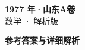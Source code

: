 \documentclass[zihao=-4, a4paper]{ctexart}
\begin{document}
\begin{center}
  {\Large\bfseries 1977 年·山东A卷}\\[4pt]
  {\large 数学 · 解析版}
\end{center}
\medskip
{}

\clearpage
{}
\begin{center}{\Large\bfseries 参考答案与详细解析}\end{center}
\medskip

\end{document}
